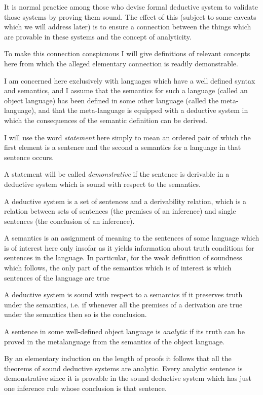 \documentclass{rbjk}
\begin{document}
\begin{article}
{}

It is normal practice among those who devise formal deductive system to validate those systems by proving them sound.
The effect of this (subject to some caveats which we will address later) is to ensure a connection between the things which are provable in these systems and the concept of analyticity.

To make this connection conspicuous I will give definitions of relevant concepts here from which the alleged elementary connection is readily demonstrable.

I am concerned here exclusively with languages which have a well defined syntax and semantics, and I assume that the semantics for such a language (called an object language) has been defined in some other language (called the meta-language), and that the meta-language is equipped with a deductive system in which the consequences of the semantic definition can be derived.

I will use the word {\it statement} here simply to mean an ordered pair of which the first element is a sentence and the second a semantics for a language in that sentence occurs.

A statement will be called {\it demonstrative} if the sentence is derivable in a deductive system which is sound with respect to the semantics.

A deductive system is a set of sentences and a derivability relation, which is a relation between sets of sentences (the premises of an inference) and single sentences (the conclusion of an inference).

A semantics is an assignment of meaning to the sentences of some language which is of interest here only insofar as it yields information about truth conditions for sentences in the language.
In particular, for the weak definition of soundness which follows, the only part of the semantics which is of interest is which sentences of the language are true

A deductive system is sound with respect to a semantics if it preserves truth under the semantics, i.e. if whenever all the premises of a derivation are true under the semantics then so is the conclusion.

A sentence in some well-defined object language is {\it analytic} if its truth can be proved in the metalanguage from the semantics of the object language.

By an elementary induction on the length of proofs it follows that all the theorems of sound deductive systems are analytic.
Every analytic sentence is demonstrative since it is provable in the sound deductive system which has just one inference rule whose conclusion is that sentence.


\end{article}
\end{document}
